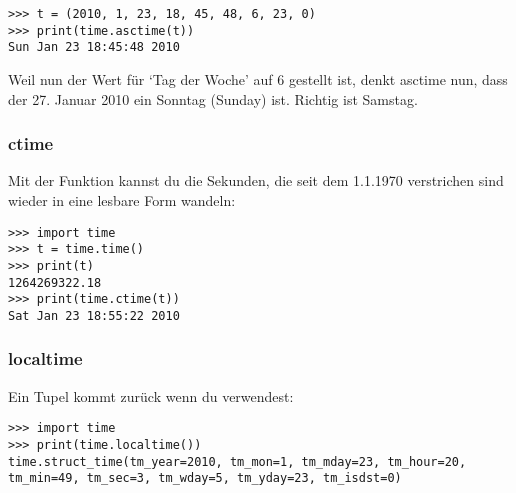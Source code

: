 \begin{Verbatim}[frame=single]
>>> t = (2010, 1, 23, 18, 45, 48, 6, 23, 0)
>>> print(time.asctime(t))
Sun Jan 23 18:45:48 2010
\end{Verbatim}

\noindent
Weil nun der Wert für `Tag der Woche' auf 6 gestellt ist, denkt asctime nun, dass der 27. Januar 2010 ein Sonntag (Sunday) ist. Richtig ist Samstag.

\subsubsection*{ctime}
Mit der  Funktion kannst du die Sekunden, die seit dem 1.1.1970 verstrichen sind wieder in eine lesbare Form wandeln:

\begin{Verbatim}[frame=single]
>>> import time
>>> t = time.time()
>>> print(t)
1264269322.18
>>> print(time.ctime(t))
Sat Jan 23 18:55:22 2010
\end{Verbatim}

\noindent
\subsubsection*{localtime}
Ein Tupel kommt zurück wenn du  verwendest:

\begin{Verbatim}[frame=single]
>>> import time
>>> print(time.localtime())
time.struct_time(tm_year=2010, tm_mon=1, tm_mday=23, tm_hour=20, 
tm_min=49, tm_sec=3, tm_wday=5, tm_yday=23, tm_isdst=0)
\end{Verbatim}

